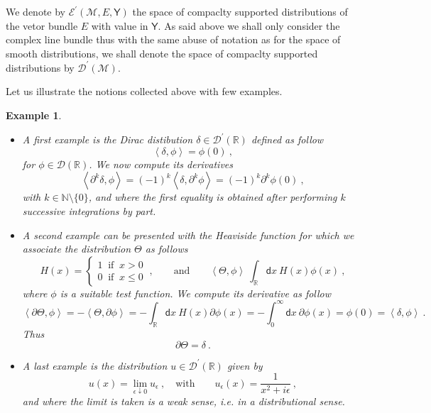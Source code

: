 \documentclass[11pt]{book}
\newcommand{\sm}[1]{\left\langle#1\right\rangle}
\newcommand{\Dcal}{\mathcal{D}}
\newcommand{\Ecal}{\mathcal{E}}
\newcommand{\Mcal}{\mathcal{M}}
\newcommand{\Nbb}{\mathbb{N}}
\newcommand{\Rbb}{\mathbb{R}}
\newcommand{\Ysf}{\mathsf{Y}}
\newcommand{\dsf}{\mathsf{d}}
\theoremstyle{break}
\newtheorem{example}{Example}[chapter]
\begin{document}
We denote by $\Ecal^\prime(\Mcal,E,\Ysf)$ the space of compaclty supported distributions of the vetor bundle $E$ with value in $\Ysf$. As said above we shall only consider the complex line bundle thus with the same abuse of notation as for the space of smooth distributions, we shall denote the space of compaclty supported distributions by $\Dcal^\prime(\Mcal)$.


\bigskip


Let us illustrate the notions collected above with few examples. 


\begin{example}
\begin{itemize}

\item A first example is the Dirac distibution $\delta \in \Dcal^\prime(\Rbb)$ defined as follow
%
\begin{equation*}
\sm{\delta , \phi} = \phi(0) \ , 
\end{equation*}
%
for $\phi \in \Dcal(\Rbb)$. We now compute its derivatives
%
\begin{equation*}
\sm{\partial^k \delta , \phi} = (-1)^k \sm{\delta , \partial^k \phi} =  (-1)^k \partial^k \phi(0) \ ,
\end{equation*}
%
with $k \in \Nbb \setminus \{0\}$, and where the first equality is obtained after performing $k$ successive integrations by part. 


\item A second example can be presented with the Heaviside function for which we associate the distribution $\Theta$ as follows
%
\begin{equation*}
H(x) = \left\{
\begin{array}{l}
1 \ \mbox{ if } \ x > 0 \\
0 \ \mbox{ if } \ x \leq 0
\end{array}
\right. \ , \qquad \mbox{and} \qquad \sm{\Theta,\phi} \ \int_\Rbb \dsf x \ H(x) \phi(x) \ ,
\end{equation*}
%
where $\phi$ is a suitable test function. We compute its derivative as follow
%
\begin{equation*}
\sm{\partial \Theta , \phi} = - \sm{\Theta , \partial \phi} = - \int_\Rbb \dsf x \ H(x) \partial \phi(x) = - \int_0^\infty \dsf x \ \partial \phi(x) = \phi(0) = \sm{\delta , \phi} \ .
\end{equation*}
%
Thus
%
\begin{equation*}
\partial \Theta = \delta \ . 
\end{equation*}


\item A last example is the distribution $u \in \Dcal^\prime(\Rbb)$ given by
%
\begin{equation*}
u(x) = \lim_{\epsilon \downarrow 0} u_\epsilon \ , \quad \mbox{with} \qquad u_\epsilon(x) = \frac{1}{x^2 + i \epsilon} \ ,
\end{equation*}
%
and where the limit is taken is a weak sense, i.e. in a distributional sense.

\end{itemize}
\end{example}
\end{document}
